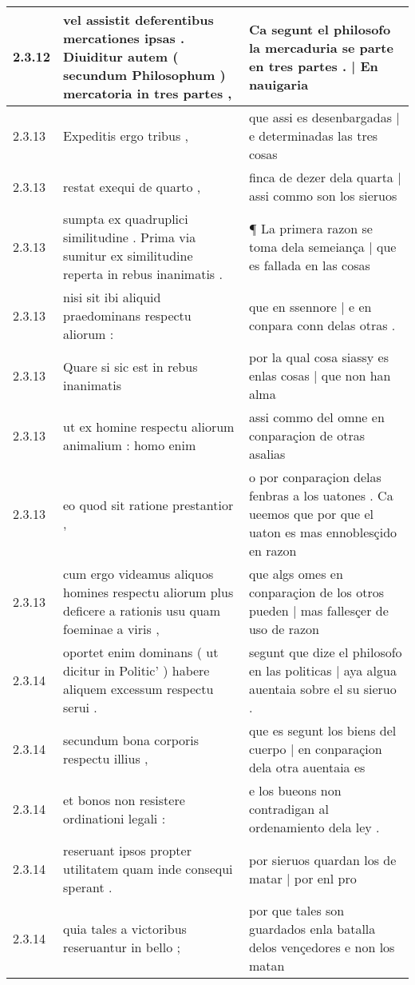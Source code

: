 \begin{tabular}{|p{1cm}|p{6.5cm}|p{6.5cm}|}
2.3.12 & vel assistit deferentibus mercationes ipsas . Diuiditur autem ( secundum Philosophum ) mercatoria in tres partes , & Ca segunt el philosofo la mercaduria se parte en tres partes . | En nauigaria \\\hline
2.3.13 & Expeditis ergo tribus , & que assi es desenbargadas | e determinadas las tres cosas \\\hline
2.3.13 & restat exequi de quarto , & finca de dezer dela quarta | assi commo son los sieruos \\\hline
2.3.13 & sumpta ex quadruplici similitudine . Prima via sumitur ex similitudine reperta in rebus inanimatis . & ¶ La primera razon se toma dela semeiança | que es fallada en las cosas \\\hline
2.3.13 & nisi sit ibi aliquid praedominans respectu aliorum : & que en ssennore | e en conpara conn delas otras . \\\hline
2.3.13 & Quare si sic est in rebus inanimatis & por la qual cosa siassy es enlas cosas | que non han alma \\\hline
2.3.13 & ut ex homine respectu aliorum animalium : homo enim & assi commo del omne en conparaçion de otras asalias \\\hline
2.3.13 & eo quod sit ratione prestantior , & o por conparaçion delas fenbras a los uatones . Ca ueemos que por que el uaton es mas ennoblesçido en razon \\\hline
2.3.13 & cum ergo videamus aliquos homines respectu aliorum plus deficere a rationis usu quam foeminae a viris , & que algs omes en conparaçion de los otros pueden | mas fallesçer de uso de razon \\\hline
2.3.14 & oportet enim dominans ( ut dicitur in Politic’ ) habere aliquem excessum respectu serui . & segunt que dize el philosofo en las politicas | aya algua auentaia sobre el su sieruo . \\\hline
2.3.14 & secundum bona corporis respectu illius , & que es segunt los biens del cuerpo | en conparaçion dela otra auentaia es \\\hline
2.3.14 & et bonos non resistere ordinationi legali : & e los bueons non contradigan al ordenamiento dela ley . \\\hline
2.3.14 & reseruant ipsos propter utilitatem quam inde consequi sperant . & por sieruos quardan los de matar | por enl pro \\\hline
2.3.14 & quia tales a victoribus reseruantur in bello ; & por que tales son guardados enla batalla delos vençedores e non los matan \\\hline

\end{tabular}
